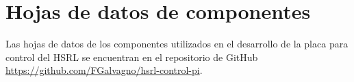 \chapter{Hojas de datos de componentes}
\label{anexo:hojas_datos}

Las hojas de datos de los componentes utilizados en el desarrollo de la placa para control del HSRL se encuentran en el repositorio de GitHub \url{https://github.com/FGalvagno/hsrl-control-pi}. \cite{repo}
